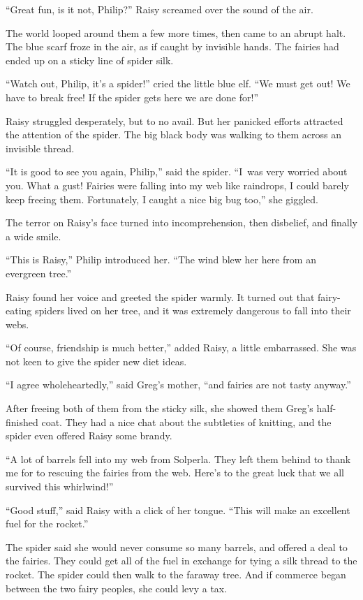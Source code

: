\documentclass[10pt]{memoir}
\begin{document}
``Great fun, is it not, Philip?'' Raisy screamed over the sound of the air.

The world looped around them a few more times, then came to an abrupt halt. The
blue scarf froze in the air, as if caught by invisible hands. The fairies had
ended up on a sticky line of spider silk.

``Watch out, Philip, it's a spider!'' cried the little blue elf. ``We must get
out! We have to break free! If the spider gets here we are done for!''

Raisy struggled desperately, but to no avail. But her panicked efforts
attracted the attention of the spider. The big black body was walking to them
across an invisible thread.

``It is good to see you again, Philip,'' said the spider. ``I~was very worried
about you. What a gust! Fairies were falling into my web like raindrops, I
could barely keep freeing them. Fortunately, I caught a nice big bug too,'' she
giggled.

The terror on Raisy's face turned into incomprehension, then disbelief, and
finally a wide smile.

``This is Raisy,'' Philip introduced her. ``The wind blew her here from an
evergreen tree.''

Raisy found her voice and greeted the spider warmly. It turned out that
fairy-eating spiders lived on her tree, and it was extremely dangerous to fall
into their webs.

``Of course, friendship is much better,'' added Raisy, a little embarrassed.
She was not keen to give the spider new diet ideas.

``I agree wholeheartedly,'' said Greg's mother, ``and fairies are not tasty
anyway.''

After freeing both of them from the sticky silk, she showed them Greg's
half-finished coat. They had a nice chat about the subtleties of knitting, and
the spider even offered Raisy some brandy.

``A lot of barrels fell into my web from Solperla. They left them behind to
thank me for to rescuing the fairies from the web. Here's to the great luck
that we all survived this whirlwind!''

``Good stuff,'' said Raisy with a click of her tongue. ``This will make an
excellent fuel for the rocket.''

The spider said she would never consume so many barrels, and offered a deal to
the fairies. They could get all of the fuel in exchange for tying a silk thread
to the rocket. The spider could then walk to the faraway tree. And if commerce
began between the two fairy peoples, she could levy a tax.
\end{document}
